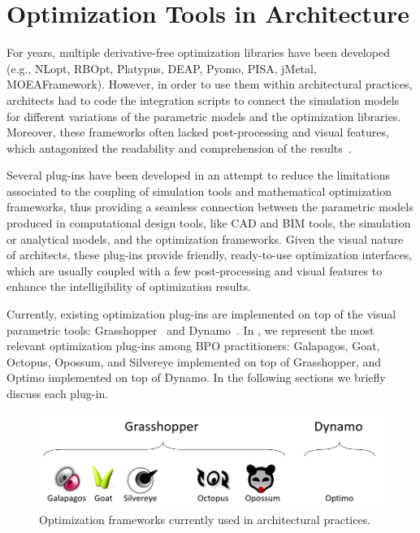 \section{Optimization Tools in Architecture}
\label{sec:plugins}
	
For years, multiple derivative-free optimization libraries have been developed (e.g., NLopt, RBOpt, Platypus, DEAP, Pyomo, PISA, jMetal, MOEAFramework). However, in order to use them within architectural practices, architects had to code the integration scripts to connect the simulation models for different variations of the parametric models and the optimization libraries\cite{Attia2013}. Moreover, these frameworks often lacked post-processing and visual features, which antagonized the readability and comprehension of the results~\cite{Attia2013,Nguyen2014}.
	
Several plug-ins have been developed in an attempt to reduce the limitations associated to the coupling of simulation tools and mathematical optimization frameworks, thus providing a seamless connection between the parametric models produced in computational design tools, like \ac{CAD} and \ac{BIM} tools, the simulation or analytical models, and the optimization frameworks. Given the visual nature of architects, these plug-ins provide friendly, ready-to-use optimization interfaces, which are usually coupled with a few post-processing and visual features to enhance the intelligibility of optimization results. 
	
Currently, existing optimization plug-ins are implemented on top of the visual parametric tools: Grasshopper~\cite{GRASSHOPPER} and Dynamo~\cite{DYNAMOBIM}. In , we represent the most relevant optimization plug-ins among \ac{BPO} practitioners: Galapagos, Goat, Octopus, Opossum, and Silvereye implemented on top of Grasshopper, and Optimo implemented on top of Dynamo. In the following sections we briefly discuss each plug-in.
	
\begin{figure}
\centering
\includegraphics[width=\textwidth]{Images/Background/opt-plugins.PNG}
\caption[Optimization Frameworks in the Architectural Practice]{Optimization frameworks currently used in architectural practices.}
\label{fig:opt-plugins}
\end{figure}

